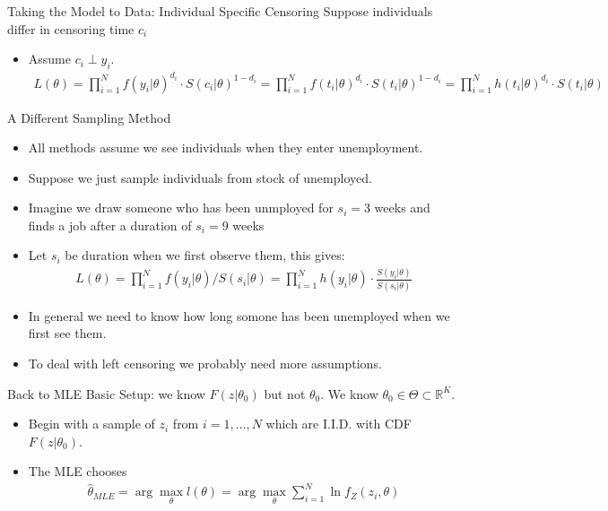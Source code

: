 \documentclass[aspectratio=169]{beamer}
\begin{document}
\begin{frame}{Taking the Model to Data: Individual Specific Censoring}
Suppose individuals differ in \alert{censoring time} $c_i$
\begin{itemize}
\item Assume $c_i \perp y_i$.
\begin{align*}
L ( \theta ) = \prod _ { i = 1 } ^ { N } f \left( y _ { i } | \theta \right) ^ { d _ { i } } \cdot S \left( c _ { i } | \theta \right) ^ { 1 - d _ { i } } = \prod _ { i = 1 } ^ { N } f \left( t _ { i } | \theta \right) ^ { d _ { i } } \cdot S \left( t _ { i } | \theta \right) ^ { 1 - d _ { i } }
= \prod _ { i = 1 } ^ { N } h \left( t _ { i } | \theta \right) ^ { d _ { i } } \cdot S \left( t _ { i } | \theta \right)
\end{align*}
\end{itemize}
\end{frame}



\begin{frame}{A Different Sampling Method}
\begin{itemize}
\item All methods assume we see individuals when they enter unemployment.
\item Suppose we just sample individuals from \alert{stock} of unemployed.
\item Imagine we draw someone who has been unmployed for $s_i=3$ weeks and finds a job after a duration of $s_i=9$ weeks
\item Let $s_i$ be duration when we first observe them, this gives:
\begin{align*}
L ( \theta ) = \prod _ { i = 1 } ^ { N } f \left( y _ { i } | \theta \right) / S \left( s _ { i } | \theta \right) = \prod _ { i = 1 } ^ { N } h \left( y _ { i } | \theta \right) \cdot \frac { S \left( y _ { i } | \theta \right) } { S \left( s _ { i } | \theta \right) }
\end{align*}
\item In general we need to know how long somone has been unemployed when we first see them. 
\item To deal with \alert{left censoring} we probably need more assumptions.
\end{itemize}
\end{frame}


\begin{frame}{Back to MLE}
Basic Setup: we know $F(z|\theta_0)$ but not $\theta_0$. We know $\theta_0 \in \Theta \subset \mathbb{R}^K$.
\begin{itemize}
\item Begin with a sample of $z_i$ from $i=1,\ldots,N$ which are I.I.D. with CDF $F(z|\theta_0)$.
\item The MLE chooses
\begin{align*}
\widehat{\theta}_{MLE} = \arg \max_{\theta} l(\theta) = \arg \max_{\theta} \sum_{i=1}^N \ln f_Z(z_i,\theta)
\end{align*}
\end{itemize}
\end{frame}
\end{document}
